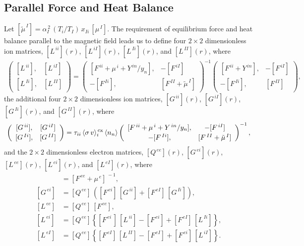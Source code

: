 \documentclass[notitlepage,12pt]{article}
\begin{document}
\subsection{Parallel Force and Heat Balance}\label{sbalance}
Let
$[\tilde{\mu}^{\,I}] =\alpha_I^{\,2}\,(T_i/T_I)\,x_{Ii}\,[\mu^{\,I}]$.
The requirement of equilibrium force and heat balance parallel to the magnetic field leads us to define
four $2\times 2$  dimensionless ion matrices, $[L^{\,ii}](r)$, $[L^{\,iI}](r)$, $[L^{\,Ii}](r)$, and $[L^{\,II}](r)$,
where
\begin{align}
\left(\begin{array}{cc} [L^{\,ii}], & [L^{\,iI}]\\[0.5ex] [L^{\,Ii}],& [L^{\,II}]\end{array}\right)=
\left(\begin{array}{cc}[F^{\,ii}+\mu^{\,i}+ Y^{\,in}/y_n], & -[F^{\,iI}]\\[0.5ex] -[F^{\,Ii}], & [F^{\,II}+\tilde{\mu}^{\,I}]\end{array}\right)^{-1}
\left(\begin{array}{cc} [F^{\,ii}+Y^{\,in}], & -[F^{\,iI}]\\[0.5ex] -[F^{\,Ii}], & [F^{\,II}]\end{array}\right),
\end{align}
the additional  four $2\times 2$  dimensionless ion matrices, $[G^{\,ii}](r)$, $[G^{\,iI}](r)$, $[G^{\,Ii}](r)$, and $[G^{\,II}](r)$,
where
\begin{align}
\left(\begin{array}{cc} [G^{\,ii}], & [G^{\,iI}]\\[0.5ex] [G^{\,Ii}],& [G^{\,II}]\end{array}\right)=\tau_{ii}\,\langle \sigma\,v\rangle_i^{\,\rm cx}
\,\langle n_n\rangle
\left(\begin{array}{cc}[F^{\,ii}+\mu^{\,i}+ Y^{\,in}/y_n], & -[F^{\,iI}]\\[0.5ex] -[F^{\,Ii}], & [F^{\,II}+\tilde{\mu}^{\,I}]\end{array}\right)^{-1},
\end{align}
and the $2\times 2$ dimensionless electron matrices, $[Q^{\,ee}](r)$, $[G^{\,ei}](r)$, $[L^{\,ee}](r)$, $[L^{\,ei}](r)$, 
and $[L^{\,eI}](r)$, 
where
\begin{align}
[Q^{\,ee}]&= [F^{\,ee}+\mu^{\,e}]^{\,-1},\\[0.5ex]
[G^{\,ei}] &= [Q^{\,ee}]\,([F^{\,ei}]\,[G^{\,ii}]+ [F^{\,eI}]\,[G^{\,Ii}]),\\[0.5ex]
[L^{\,ee}] &= [Q^{\,ee}]\,[F^{\,ee}],\\[0.5ex]
[L^{\,ei}] &= [Q^{\,ee}]\left\{[F^{\,ei}\,]\,[L^{\,ii}]-[F^{\,ei}]+[F^{\,eI}]\,[L^{\,Ii}]\right\},\\[0.5ex]
[L^{\,eI}] &= [Q^{\,ee}]\left\{[F^{\,eI}]\,[L^{\,II}]-[F^{\,eI}]+[F^{\,ei}]\,[L^{\,iI}]\right\}.
\end{align}
\end{document}
